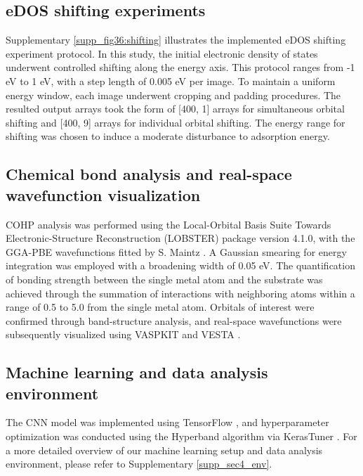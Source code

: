     \subsection{eDOS shifting experiments}
    Supplementary \cref{supp_fig36:shifting} illustrates the implemented eDOS shifting experiment protocol.
    In this study, the initial electronic density of states underwent controlled shifting along the energy axis.
    This protocol ranges from -1 eV to 1 eV, with a step length of 0.005 eV per image.
    To maintain a uniform energy window, each image underwent cropping and padding procedures.
    The resulted output arrays took the form of [400, 1] arrays for simultaneous orbital shifting and [400, 9] arrays for individual orbital shifting.
    The energy range for shifting was chosen to induce a moderate disturbance to adsorption energy.


    \subsection{Chemical bond analysis and real-space wavefunction visualization}
    COHP analysis was performed using the Local-Orbital Basis Suite Towards Electronic-Structure Reconstruction (LOBSTER) package \cite{deringer2011crystal, koga1999analytical, nelson2020lobster, maintz2013analytic, dronskowski1993crystal} version 4.1.0, with the GGA-PBE wavefunctions fitted by S. Maintz \cite{koga1999analytical, maintz2016lobster}.
    A Gaussian smearing for energy integration was employed with a broadening width of 0.05 eV.
    The quantification of bonding strength between the single metal atom and the substrate was achieved through the summation of interactions with neighboring atoms within a range of 0.5 \text{\AA} to 5.0 \text{\AA} from the single metal atom.
    Orbitals of interest were confirmed through band-structure analysis, and real-space wavefunctions were subsequently visualized using VASPKIT \cite{wang2021vaspkit} and VESTA \cite{momma2008vesta}.

    \subsection{Machine learning and data analysis environment}
    The CNN model was implemented using TensorFlow \cite{abadi2016tensorflow}, and hyperparameter optimization was conducted using the Hyperband \cite{li2018hyperband} algorithm via KerasTuner \cite{omalley2019kerastuner}.
    For a more detailed overview of our machine learning setup and data analysis environment, please refer to Supplementary \cref{supp_sec4_env}.


